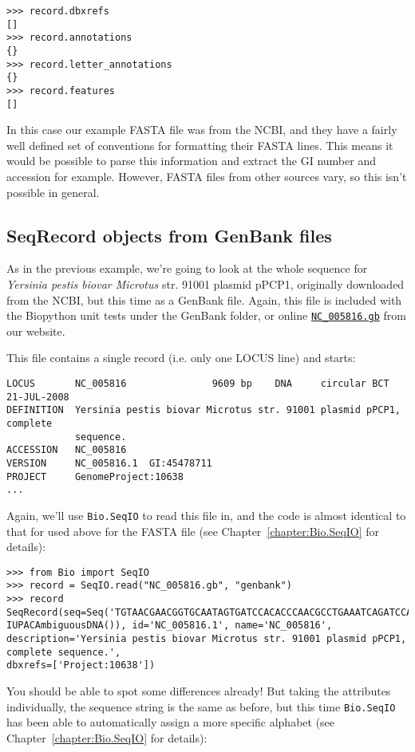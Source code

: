 \begin{verbatim}
>>> record.dbxrefs
[]
>>> record.annotations
{}
>>> record.letter_annotations
{}
>>> record.features
[]
\end{verbatim}

In this case our example FASTA file was from the NCBI, and they have a fairly well defined set of conventions for formatting their FASTA lines. This means it would be possible to parse this information and extract the GI number and accession for example. However, FASTA files from other sources vary, so this isn't possible in general.

\subsection{SeqRecord objects from GenBank files}

As in the previous example, we're going to look at the whole sequence for \textit{Yersinia pestis biovar Microtus} str. 91001 plasmid pPCP1, originally downloaded from the NCBI, but this time as a GenBank file.
Again, this file is included with the Biopython unit tests under the GenBank folder, or online \href{http://biopython.org/SRC/biopython/Tests/GenBank/NC_005816.gb}{\texttt{NC\_005816.gb}} from our website.

This file contains a single record (i.e. only one LOCUS line) and starts:
\begin{verbatim}
LOCUS       NC_005816               9609 bp    DNA     circular BCT 21-JUL-2008
DEFINITION  Yersinia pestis biovar Microtus str. 91001 plasmid pPCP1, complete
            sequence.
ACCESSION   NC_005816
VERSION     NC_005816.1  GI:45478711
PROJECT     GenomeProject:10638
...
\end{verbatim}

Again, we'll use \verb|Bio.SeqIO| to read this file in, and the code is almost identical to that for used above for the FASTA file (see Chapter~\ref{chapter:Bio.SeqIO} for details):

\begin{verbatim}
>>> from Bio import SeqIO
>>> record = SeqIO.read("NC_005816.gb", "genbank")
>>> record
SeqRecord(seq=Seq('TGTAACGAACGGTGCAATAGTGATCCACACCCAACGCCTGAAATCAGATCCAGG...CTG',
IUPACAmbiguousDNA()), id='NC_005816.1', name='NC_005816',
description='Yersinia pestis biovar Microtus str. 91001 plasmid pPCP1, complete sequence.',
dbxrefs=['Project:10638'])
\end{verbatim}

You should be able to spot some differences already! But taking the attributes individually,
the sequence string is the same as before, but this time \verb|Bio.SeqIO| has been able to automatically assign a more specific alphabet (see Chapter~\ref{chapter:Bio.SeqIO} for details):

